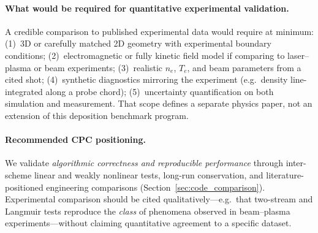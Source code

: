 \paragraph{What would be required for quantitative experimental validation.}
A credible comparison to published experimental data would require at minimum:
(1)~3D or carefully matched 2D geometry with experimental boundary conditions;
(2)~electromagnetic or fully kinetic field model if comparing to laser--plasma or beam experiments;
(3)~realistic $n_e$, $T_e$, and beam parameters from a cited shot;
(4)~synthetic diagnostics mirroring the experiment (e.g.\ density line-integrated along a probe chord);
(5)~uncertainty quantification on both simulation and measurement.
That scope defines a separate physics paper, not an extension of this deposition benchmark program.

\paragraph{Recommended CPC positioning.}
We validate \emph{algorithmic correctness and reproducible performance} through inter-scheme linear and weakly nonlinear tests, long-run conservation, and literature-positioned engineering comparisons (Section~\ref{sec:code_comparison}).
Experimental comparison should be cited qualitatively---e.g.\ that two-stream and Langmuir tests reproduce the \emph{class} of phenomena observed in beam--plasma experiments---without claiming quantitative agreement to a specific dataset.
